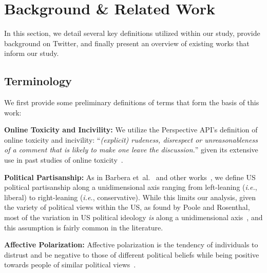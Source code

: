\section{Background \& Related Work} In this section, we detail several key definitions utilized within our study, provide background on Twitter, and finally present an overview of existing works that inform our study.


\subsection{Terminology}\label{sec:misinformation-defintion}
We first provide some preliminary definitions of terms that form the basis of this work:

\vspace{2pt}
\noindent
\textbf{Online Toxicity and Incivility:} We utilize the Perspective API's definition of online toxicity and incivility: ``\textit{(explicit) rudeness, disrespect or unreasonableness of a comment that is likely to make one leave the
discussion.}'' given its extensive use in past studies of online toxicity~\cite{hua2020characterizing, saveski2021structure, xia2020exploring, kumar2023understanding}. 


\vspace{2pt}
\noindent
\textbf{Political Partisanship:}  As in Barbera {et~al.}~\cite{barbera2015birds} and other works~\cite{saveski2022perspective,saveski2022engaging}, we define US political partisanship along a unidimensional axis ranging from left-leaning (\textit{i.e.}, liberal) to right-leaning (\textit{i.e.}, conservative). While this limits our analysis, given the variety of political views within the US, as found by Poole and Rosenthal, most of the variation in US political ideology \emph{is} along a unidimensional axis~\cite{poole2007party}, and this assumption is fairly common in the literature. 




\vspace{2pt}
\noindent
\textbf{Affective Polarization:} 
Affective polarization is the tendency of individuals to distrust and be negative to those of different political beliefs while being positive towards people of similar political views~\cite{druckman2021affective}.



